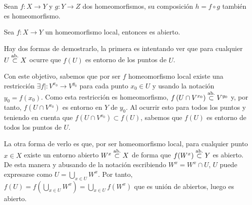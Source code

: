\begin{prop}
Sean $f: X \rightarrow Y$ y $g: Y \rightarrow Z$ dos homeomorfismos, su composición $h = f \circ g$ también es homeomorfismo.
\end{prop}

\begin{prop}
Sea $f:X\rightarrow Y$ un homeomorfismo local, entonces es abierto.
\end{prop}
\begin{demo}
Hay dos formas de demostrarlo, la primera es intentando ver que para cualquier $U \stackrel{\text{ab.}}{\subset} X$ ocurre que $f\left( U \right)$ es entorno de los puntos de $U$.

Con este objetivo, sabemos que por ser $f$ homeomorfismo local existe una restricción $\exists f| : V^{x_0} \rightarrow V^{y_0}$ para cada punto $x_0\in U$ y usando la notación $y_0 = f(x_0)$. Como esta restricción es homeomorfismo, $f\left( U \cap V^{x_0} \right) \stackrel{\text{ab.}}{\subset} V^{y_0}$ y, por tanto, $ f \left( U \cap V^{x_0} \right)$ es entorno en $Y$ de $y_0$. Al ocurrir esto para todos los puntos y teniendo en cuenta que $f \left( U \cap V^{x_0} \right)\subset f(U)$, sabemos que $f(U)$ es entorno de todos los puntos de $U$.

La otra forma de verlo es que, por ser homeomorfismo local, para cualquier punto $x\in X$ existe un entorno abierto $W^x \stackrel{\text{ab.}}{\subset} X$ de forma que $f(W^x)\stackrel{\text{ab.}}{\subset} Y$ es abierto. De esta manera y abusando de la notación escribiendo $W^x = W^x \cap U$, $U$ puede expresarse como $U = \bigcup_{x\in U} W^x$. Por tanto, $f(U) = f(\bigcup_{x\in U} W^x) = \bigcup_{x\in U} f(W^x)$ que es unión de abiertos, luego es abierto.
\end{demo}

